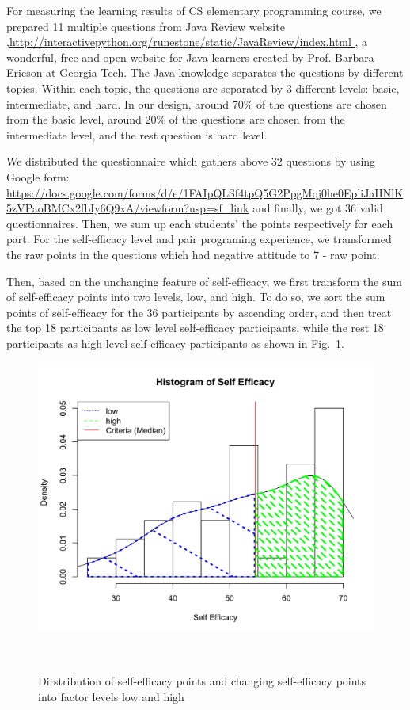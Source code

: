 \documentclass{sigchi}
\begin{document}
For measuring the learning results of CS elementary programming course, we prepared 11 multiple questions from Java Review website ,\url{http://interactivepython.org/runestone/static/JavaReview/index.html }, a wonderful, free and open website for Java learners created by Prof. Barbara Ericson at Georgia Tech.  The Java knowledge separates the questions by different topics. Within each topic, the questions are separated by 3 different levels: basic, intermediate, and hard. In our design, around 70\% of the questions are chosen from the basic level, around 20\% of the questions are chosen from the intermediate level, and the rest question is hard level. 

We distributed the questionnaire which gathers above 32  questions by using Google form: 
\url{https://docs.google.com/forms/d/e/1FAIpQLSf4tpQ5G2PpgMqj0he0EpliJaHNlK5zVPaoBMCx2fbIy6Q9xA/viewform?usp=sf_link} and finally, we got 36 valid questionnaires. Then, we sum up each students’ the points respectively for each part. For the self-efficacy level and pair programing experience,  we transformed the raw points in the questions which had negative attitude to 7 - raw point. 

Then, based on the unchanging feature of self-efficacy, we first transform the sum of self-efficacy points into two levels, low, and high. To do so, we sort the sum points of self-efficacy for the 36 participants by ascending order, and then treat the top 18 participants as low level self-efficacy participants, while the rest 18 participants as high-level self-efficacy participants as shown in Fig.~\ref{fig:figure1}.

\begin{figure}
\centering
  \includegraphics[width=0.9\columnwidth]{figures/hist1}
  \caption{Dirstribution of self-efficacy points and changing self-efficacy points into  factor levels low and high }~\label{fig:figure1}
\end{figure}
\end{document}
